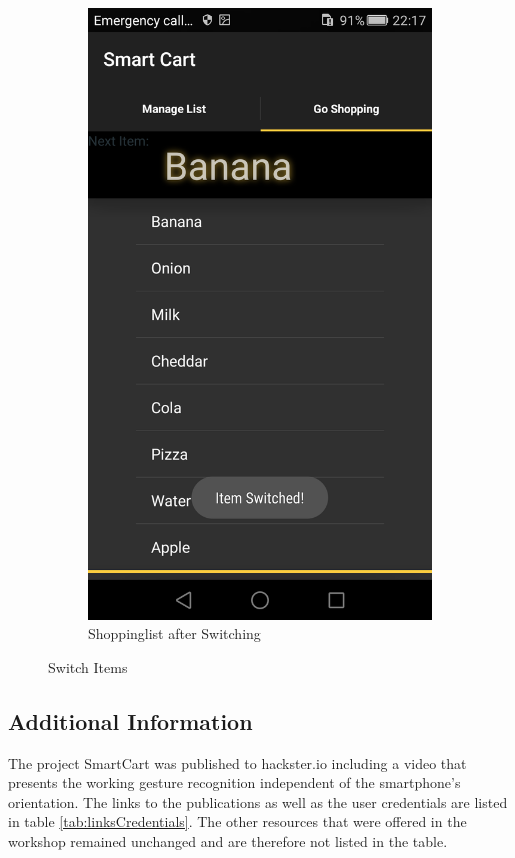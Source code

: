\begin{figure}[h]
\begin{subfigure}{0.475\textwidth}
\centering
\includegraphics[height= 0.3\textheight]{res/usermanual/switched.png}
\caption{Shoppinglist after Switching}
\label{fig:afterSwitching}
\end{subfigure}
\caption{Switch Items}
\label{fig:checkItems}
\end{figure}

\subsection{Additional Information}
The project SmartCart was published to hackster.io including a video that
presents the working gesture recognition independent of the smartphone's
orientation. The links to the publications as well as the
user credentials are listed in table \ref{tab:linksCredentials}. The other
resources that were offered in the workshop remained unchanged and are therefore
not listed in the table.

